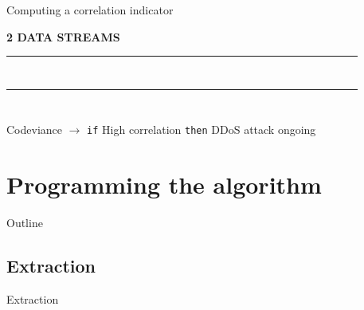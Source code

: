 \documentclass[mathserif]{beamer}
\begin{document}
	\begin{frame}{Computing a correlation indicator}
	
	\begin{center}
		\textbf{2 DATA STREAMS}
	\end{center}
	
	\begin{center}\begin{tabular}{|c|c|c|c|c|c|c|c|c|c|c|c|c|c|c|c|c|c|c|c|}
	\hline
	~ & ~ & \cellcolor{purple}~ & ~ & \cellcolor{purple}~ & ~ & ~ & \cellcolor{purple}~ & ~ & ~ & \cellcolor{purple}~ & ~ & ~ & ~ & ~ & ~ & ~ &\cellcolor{purple}~ & ~ & ~ \\
	\hline
	\end{tabular}\end{center}
	
	\begin{center}\begin{tabular}{|c|c|c|c|c|c|c|c|c|c|c|c|c|c|c|c|c|c|c|c|}
	\hline
	\cellcolor{purple}~ & ~ & ~ & ~ & \cellcolor{purple}~ & ~ & \cellcolor{purple}~ & ~ & ~ & ~ & \cellcolor{purple}~ & ~ & ~ & ~ & \cellcolor{purple}~ & ~ & ~ & ~ & \cellcolor{purple}~ & ~ \\
	\hline
	\end{tabular}\end{center}
	
	\begin{alertblock}{Codeviance $\longrightarrow$ \texttt{if} High correlation \texttt{then} DDoS attack ongoing}
	\end{alertblock}
	
	
	\end{frame}
	

\section{Programming the algorithm}

	\begin{frame}{Outline}
		\tableofcontents[currentsection]
	\end{frame}

	\subsection{Extraction}
	
	\begin{frame}{Extraction}
	\end{frame}
	
\end{document}
